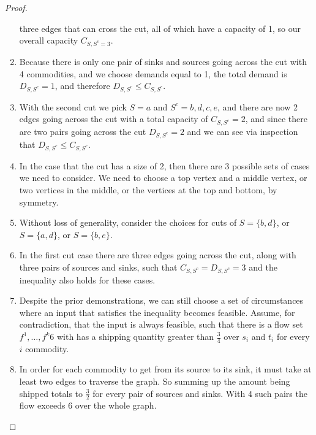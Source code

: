 \documentclass{article}
\begin{document}
\begin{proof}
\begin{enumerate}
                  three edges that can cross the cut, all of which have a capacity of 1, so our
                  overall capacity \(C_{S,S^c = 3}\).
            \item Because there is only one pair of sinks and sources going across the cut
                  with 4 commodities, and we choose demands equal to 1, the total demand is
                  \(D_{S, S^c} = 1 \), and therefore \(D_{S,S^c} \leq C_{S,S^c}\).
            \item With the second cut we pick \(S = a\) and \(S^c = {b, d, c, e}\), and
                  there are now 2 edges going across the cut with a total capacity of
                  \(C_{S,S^c} = 2\), and since there are two pairs going across the cut
                  \(D_{S,S^c} = 2\) and we can see via inspection that \(D_{S,S^c} \leq
                  C_{S,S^c}\).
            \item In the case that the cut has a size of 2, then there are 3 possible
                  sets of cases we need to consider. We need to choose a top vertex and a middle
                  vertex, or two vertices in the middle, or the vertices at the top and bottom,
                  by symmetry.
            \item Without loss of generality, consider the choices for cuts of \(S = \{ b, d\} \),
                  or \(S = \{ a, d \} \),
                  or \(S = \{ b, e \} \).
            \item In the first cut case there are three edges going across the cut, along
                  with three pairs of sources and sinks, such that \(C_{S,S^c} = D_{S,S^c} = 3\)
                  and the inequality also holds for these cases.
            \item Despite the prior demonstrations, we can still choose a set of
                  circumstances where an input that satisfies the inequality becomes feasible.
                  Assume, for contradiction, that the input is always feasible, such that there
                  is a flow set \(f^1, \ldots, f^k 6\) with has a shipping quantity greater than
                  \(\frac{3}{4}\) over \(s_i\) and \(t_i\) for every \(i\) commodity.
            \item In order for each commodity to get from its source to its sink, it must
                  take at least two edges to traverse the graph. So summing up the amount being
                  shipped totals to \(\frac{3}{2}\) for every pair of sources and sinks.
                  With 4 such pairs the flow exceeds 6 over the whole graph.

\end{enumerate}
\end{proof}
\end{document}
